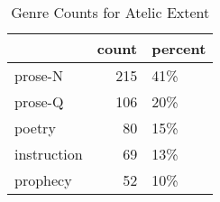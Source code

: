 \begin{table}[htbp!]
\centering
\caption{Genre Counts for Atelic Extent}
\label{table:atelext_gen_cp}
\begin{tabular}{lrl}
\toprule
{} &  count & percent \\
\midrule
prose-N     &    215 &     41\% \\
prose-Q     &    106 &     20\% \\
poetry      &     80 &     15\% \\
instruction &     69 &     13\% \\
prophecy    &     52 &     10\% \\
\bottomrule
\end{tabular}
\end{table}
